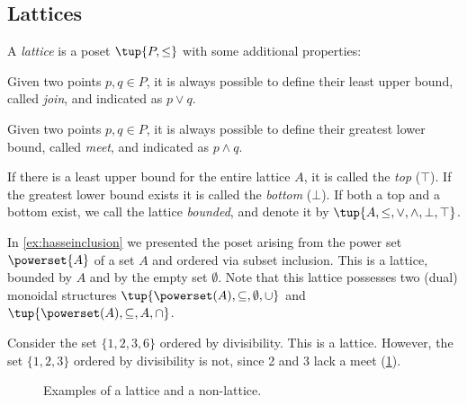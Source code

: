 \subsection{Lattices}
\begin{definition}[Lattice]
\label{def:lattice}
A \emph{lattice} is a poset $\tup{P, \leq}$ with some additional properties:
\begin{compactenum}
    \item Given two points $p, q \in P$, it is always possible to define their least upper bound, called \emph{join}, and indicated as $p \vee q$.
    \item Given two points $p, q \in P$, it is always possible to define their greatest lower bound, called \emph{meet}, and indicated as $p \wedge q$.
\end{compactenum}
\end{definition}

\begin{remark}
If there is a least upper bound for the entire lattice $A$, it is called
the \emph{top} ($\top$). If the greatest lower bound exists it is called the \emph{bottom} ($\bot$). If both a top and a bottom exist, we call the lattice \emph{bounded}, and denote it by $\tup{A,\leq,\vee,\wedge,\bot,\top}$.
\end{remark}

\begin{example}
    In \cref{ex:hasseinclusion} we presented the poset arising from the power set $\powerset{A}$ of a set $A$ and ordered via subset inclusion. This is a lattice, bounded by $A$ and by the empty set $\emptyset$. Note that this lattice possesses two (dual) monoidal structures $\tup{\powerset(A),\subseteq,\emptyset,\cup}$ and $\tup{\powerset(A),\subseteq,A,\cap}$.
\end{example}

\begin{example}
Consider the set $\{1,2,3,6\}$ ordered by divisibility. This is a lattice. However, the set $\{1,2,3\}$ ordered by divisibility is not, since 2 and 3 lack a meet (\cref{fig:exlattice}).
\begin{figure}[h!]
\begin{center}
\end{center}
\caption{Examples of a lattice and a non-lattice. \label{fig:exlattice}}
\end{figure}
\end{example}